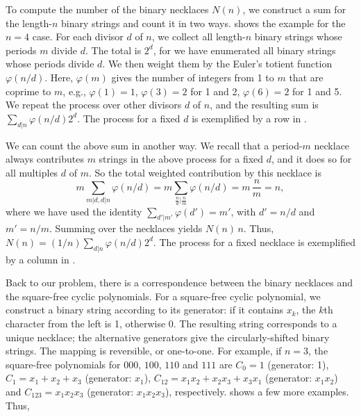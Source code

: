 \documentclass[preprint]{revtex4-1}
\begin{document}
To compute the number of the binary necklaces $N(n)$,
we construct a sum for the length-$n$ binary strings and count it in two ways.
 shows the example for the $n=4$ case.
%
For each divisor $d$ of $n$, we collect
  all length-$n$ binary strings
  whose periods $m$ divide $d$.
%
The total is $2^d$,
  for we have enumerated all binary strings whose periods divide $d$.
%
We then weight them by the Euler's totient function $\varphi(n/d)$.
%
Here, $\varphi(m)$ gives the number of integers from 1 to $m$
  that are coprime to $m$,
  e.g.,
  $\varphi(1) = 1$,
  $\varphi(3) = 2$ for 1 and 2,
  $\varphi(6) = 2$ for 1 and 5.
We repeat the process over other divisors $d$ of $n$,
  and the resulting sum is $\sum_{d|n} \varphi(n/d) 2^d$.
%
The process for a fixed $d$ is exemplified
  by a row in .

%


We can count the above sum in another way.
We recall that a period-$m$ necklace always contributes
  $m$ strings in the above process for a fixed $d$,
  and it does so for all multiples $d$ of $m$.
So the total weighted contribution by this necklace is
\begin{equation}
m \sum_{m|d, d|n} \varphi(n/d) =
 m \sum_{\frac{n}{d}|\frac{n}{m}} \varphi(n/d) = m \,  \frac{n}{m}  = n,
\label{eq:mphind}
\end{equation}
where we have used the identity $\sum_{d'|m'} \varphi(d') = m'$,
with $d' = n/d$ and $m' = n/m$.
%
Summing over the necklaces yields $N(n) \, n$. Thus,
$N(n) = (1/n) \sum_{d|n} \varphi(n/d) 2^d$.
The process for a fixed necklace is exemplified
  by a column in .
%


Back to our problem, there is
  a correspondence between the binary necklaces
  and the square-free cyclic polynomials.
For a square-free cyclic polynomial,
  we construct a binary string according to its generator:
if it contains $x_k$, the $k$th character from the left is 1,
  otherwise 0.
The resulting string corresponds to a unique necklace;
  the alternative generators give
  the circularly-shifted binary strings.
The mapping is reversible, or one-to-one.
For example, if $n = 3$,
 the square-free polynomials for $000$, $100$, $110$ and $111$ are
  $C_0 = 1$ (generator: 1),
  $C_1 = x_1 + x_2 + x_3$ (generator: $x_1$),
  $C_{12} = x_1 x_2 + x_2 x_3 + x_3 x_1$ (generator: $x_1 x_2$)
  and $C_{123} = x_1 x_2 x_3$ (generator: $x_1 x_2 x_3$), respectively.
 shows a few more examples.
%
Thus,
\end{document}
